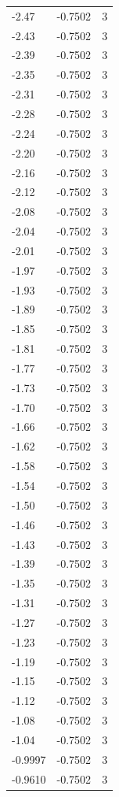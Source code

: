 \begin{longtable}{lrr}
  -2.47 & -0.7502 & 3 \\
  -2.43 & -0.7502 & 3 \\
  -2.39 & -0.7502 & 3 \\
  -2.35 & -0.7502 & 3 \\
  -2.31 & -0.7502 & 3 \\
  -2.28 & -0.7502 & 3 \\
  -2.24 & -0.7502 & 3 \\
  -2.20 & -0.7502 & 3 \\
  -2.16 & -0.7502 & 3 \\
  -2.12 & -0.7502 & 3 \\
  -2.08 & -0.7502 & 3 \\
  -2.04 & -0.7502 & 3 \\
  -2.01 & -0.7502 & 3 \\
  -1.97 & -0.7502 & 3 \\
  -1.93 & -0.7502 & 3 \\
  -1.89 & -0.7502 & 3 \\
  -1.85 & -0.7502 & 3 \\
  -1.81 & -0.7502 & 3 \\
  -1.77 & -0.7502 & 3 \\
  -1.73 & -0.7502 & 3 \\
  -1.70 & -0.7502 & 3 \\
  -1.66 & -0.7502 & 3 \\
  -1.62 & -0.7502 & 3 \\
  -1.58 & -0.7502 & 3 \\
  -1.54 & -0.7502 & 3 \\
  -1.50 & -0.7502 & 3 \\
  -1.46 & -0.7502 & 3 \\
  -1.43 & -0.7502 & 3 \\
  -1.39 & -0.7502 & 3 \\
  -1.35 & -0.7502 & 3 \\
  -1.31 & -0.7502 & 3 \\
  -1.27 & -0.7502 & 3 \\
  -1.23 & -0.7502 & 3 \\
  -1.19 & -0.7502 & 3 \\
  -1.15 & -0.7502 & 3 \\
  -1.12 & -0.7502 & 3 \\
  -1.08 & -0.7502 & 3 \\
  -1.04 & -0.7502 & 3 \\
  -0.9997 & -0.7502 & 3 \\
  -0.9610 & -0.7502 & 3 \\

\end{longtable}
